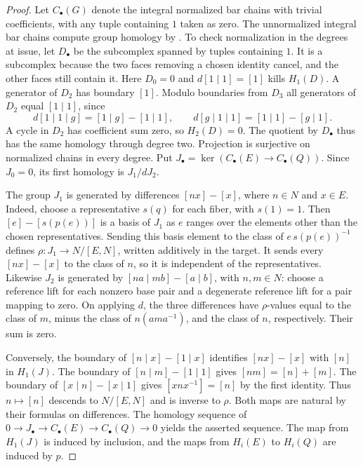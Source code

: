 \begin{proof}
Let \(C_\bullet(G)\) denote the integral normalized bar chains
with trivial coefficients, with any tuple containing \(1\) taken
as zero. The unnormalized integral bar chains compute group homology
by \cite[A10]{homalg}. To check normalization in the degrees at issue,
let \(D_\bullet\) be the subcomplex spanned by tuples containing \(1\).
It is a subcomplex because the two faces removing a chosen identity
cancel, and the other faces still contain it. Here \(D_0=0\) and
\(d[1\mid1]=[1]\) kills \(H_1(D)\). A generator of \(D_2\) has
boundary \([1]\). Modulo boundaries from \(D_3\) all generators of
\(D_2\) equal \([1\mid1]\), since
\[
 d[1\mid1\mid g]=[1\mid g]-[1\mid1],
 \qquad
 d[g\mid1\mid1]=[1\mid1]-[g\mid1].
\]
A cycle in \(D_2\) has coefficient sum zero, so \(H_2(D)=0\).
The quotient by \(D_\bullet\) thus has the same homology through
degree two. Projection is surjective on normalized chains in every degree. Put
\(J_\bullet=\ker(C_\bullet(E)\to C_\bullet(Q))\). Since \(J_0=0\),
its first homology is \(J_1/dJ_2\).

The group \(J_1\) is generated by differences \([nx]-[x]\), where
\(n\in N\) and \(x\in E\). Indeed, choose a representative \(s(q)\)
for each fiber, with \(s(1)=1\). Then \([e]-[s(p(e))]\) is a basis
of \(J_1\) as \(e\) ranges over the elements other than the chosen
representatives. Sending this basis element to the class of
\(e\,s(p(e))^{-1}\) defines \(\rho:J_1\to N/[E,N]\), written
additively in the target. It sends every \([nx]-[x]\) to the class
of \(n\), so it is independent of the representatives. Likewise
\(J_2\) is generated by \([na\mid mb]-[a\mid b]\), with \(n,m\in N\):
choose a reference lift for each nonzero base pair and a degenerate
reference lift for a pair mapping to zero. On applying \(d\), the
three differences have \(\rho\)-values equal to the class of \(m\),
minus the class of \(n(ama^{-1})\), and the class of \(n\),
respectively. Their sum is zero.

Conversely, the boundary of \([n\mid x]-[1\mid x]\) identifies
\([nx]-[x]\) with \([n]\) in \(H_1(J)\). The boundary of
\([n\mid m]-[1\mid1]\) gives \([nm]=[n]+[m]\). The boundary of
\([x\mid n]-[x\mid1]\) gives \([xnx^{-1}]=[n]\) by the first identity.
Thus \(n\mapsto[n]\) descends to \(N/[E,N]\) and is inverse to
\(\rho\). Both maps are natural by their formulas on differences.
The homology sequence of
\(0\to J_\bullet\to C_\bullet(E)\to C_\bullet(Q)\to0\) yields the
asserted sequence. The map from \(H_1(J)\) is induced by inclusion,
and the maps from \(H_i(E)\) to \(H_i(Q)\) are induced by \(p\).


\end{proof}

